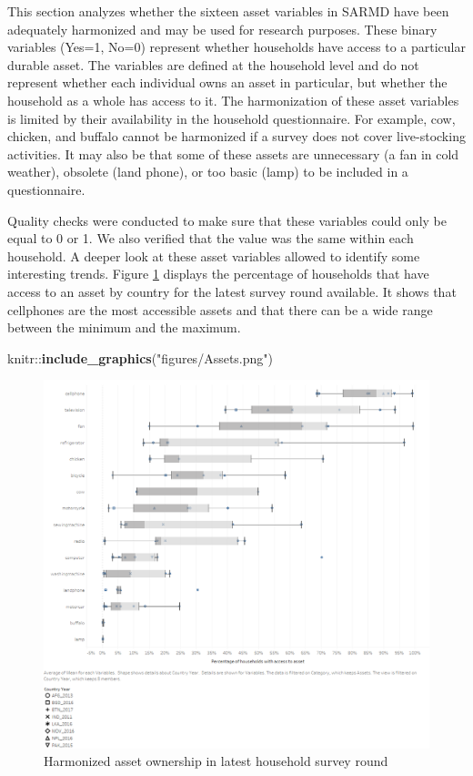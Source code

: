 \documentclass[13 pt,]{book}
\newenvironment{Shaded}{\begin{snugshade}}{\end{snugshade}}
\newcommand{\KeywordTok}[1]{\textcolor[rgb]{0.13,0.29,0.53}{\textbf{{#1}}}}
\newcommand{\StringTok}[1]{\textcolor[rgb]{0.31,0.60,0.02}{{#1}}}
\newcommand{\NormalTok}[1]{{#1}}
\begin{document}
This section analyzes whether the sixteen asset variables in SARMD have
been adequately harmonized and may be used for research purposes. These
binary variables (Yes=1, No=0) represent whether households have access
to a particular durable asset. The variables are defined at the
household level and do not represent whether each individual owns an
asset in particular, but whether the household as a whole has access to
it. The harmonization of these asset variables is limited by their
availability in the household questionnaire. For example, cow, chicken,
and buffalo cannot be harmonized if a survey does not cover
live-stocking activities. It may also be that some of these assets are
unnecessary (a fan in cold weather), obsolete (land phone), or too basic
(lamp) to be included in a questionnaire.

Quality checks were conducted to make sure that these variables could
only be equal to 0 or 1. We also verified that the value was the same
within each household. A deeper look at these asset variables allowed to
identify some interesting trends. Figure \ref{fig:assets} displays the
percentage of households that have access to an asset by country for the
latest survey round available. It shows that cellphones are the most
accessible assets and that there can be a wide range between the minimum
and the maximum.

\begin{Shaded}
\begin{Highlighting}[]
\NormalTok{knitr::}\KeywordTok{include_graphics}\NormalTok{(}\StringTok{"figures/Assets.png"}\NormalTok{)}
\end{Highlighting}
\end{Shaded}

\begin{figure}

{\centering \includegraphics[width=0.8\linewidth]{figures/Assets} 

}

\caption{Harmonized asset ownership in latest household survey round}\label{fig:assets}
\end{figure}
\end{document}
